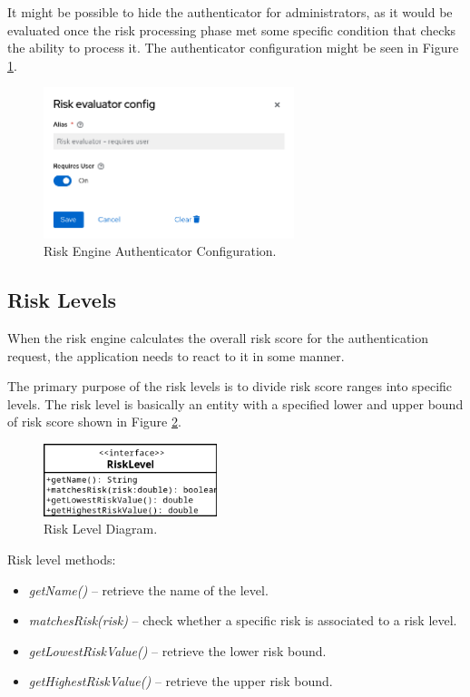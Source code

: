 It might be possible to hide the authenticator for administrators, as it would be evaluated once the risk processing phase met some specific condition that checks the ability to process it.
The authenticator configuration might be seen in Figure \ref{fig:risk-evaluator-authenticator-config}.

\begin{figure}[htbp]
  \centering
  \includegraphics[width=0.65\textwidth]{img/sections/5-design/risk-evaluator-authenticator-config.png}
  \caption{Risk Engine Authenticator Configuration.}
  \label{fig:risk-evaluator-authenticator-config}
\end{figure}

\newpage

\subsection{Risk Levels} \label{risk-levels}
When the risk engine calculates the overall risk score for the authentication request, the application needs to react to it in some manner.

The primary purpose of the risk levels is to divide risk score ranges into specific levels.
The risk level is basically an entity with a specified lower and upper bound of risk score shown in Figure \ref{fig:risk-level-diagram}.

\begin{figure}[htbp]
  \centering
  \includegraphics[width=0.45\textwidth]{img/sections/5-design/risk-level.png}
  \caption{Risk Level Diagram.}
  \label{fig:risk-level-diagram}
\end{figure}

Risk level methods:
\begin{itemize}
    \item \textit{getName()} -- retrieve the name of the level.
    \item \textit{matchesRisk(risk)} -- check whether a specific risk is associated to a risk level.
    \item \textit{getLowestRiskValue()} -- retrieve the lower risk bound.
    \item \textit{getHighestRiskValue()} -- retrieve the upper risk bound.
\end{itemize}

